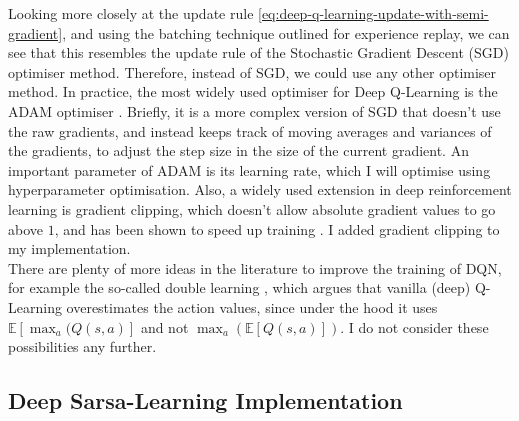 Looking more closely at the update rule \ref{eq:deep-q-learning-update-with-semi-gradient}, and using the batching technique outlined for experience replay, we can see that this resembles the update rule of the Stochastic Gradient Descent (SGD) optimiser method. Therefore, instead of SGD, we could use any other optimiser method. In practice, the most widely used optimiser for Deep Q-Learning is the ADAM optimiser \cite{kingma2015adamoptimiser}. Briefly, it is a more complex version of SGD that doesn't use the raw gradients, and instead keeps track of moving averages and variances of the gradients, to adjust the step size in the size of the current gradient. An important parameter of ADAM is its learning rate, which I will optimise using hyperparameter optimisation. Also, a widely used extension in deep reinforcement learning is gradient clipping, which doesn't allow absolute gradient values to go above $1$, and has been shown to speed up training \cite{zhang2020gradientclipping}. I added gradient clipping to my implementation.\\



There are plenty of more ideas in the literature to improve the training of DQN, for example the so-called double learning \cite{hasselt2010doubleqlearning}, which argues that vanilla (deep) Q-Learning overestimates the action values, since under the hood it uses $\mathbb{E}[\max_a(Q(s,a)]$ and not $\max_a(\mathbb{E}[Q(s,a)])$. I do not consider these possibilities any further.


\subsection{Deep Sarsa-Learning Implementation}




